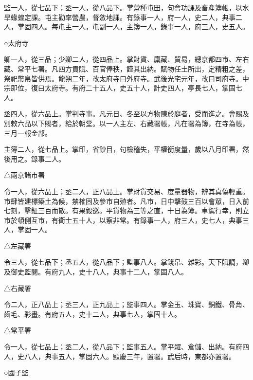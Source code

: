 \begin{pinyinscope}
 監一人，從七品下；丞一人，從八品下。掌營種屯田，句會功課及畜產簿帳，以水旱蝝蝗定課。屯主勸率營農，督斂地課。有錄事一人，府一人，史二人，典事二人，掌固四人。每屯主一人，屯副一人，主簿一人，錄事一人，府三人，史五人。



 ○太府寺



 卿一人，從三品；少卿二人，從四品上。掌財貨、廩藏、貿易，總京都四市、左右藏、常平七署。凡四方貢賦、百官俸秩，謹其出納。賦物任土所出，定精粗之差，祭祀幣帛皆供焉。龍朔二年，改太府寺曰外府寺。武後光宅元年，改曰司府寺。中宗即位，復曰太府寺。有府二十五人，史五十人，計史四人，亭長七人，掌固七人。



 丞四人，從六品上。掌判寺事。凡元日、冬至以方物陳於庭者，受而進之。會賜及別敕六品以下賜者，給於朝堂。以一人主左、右藏署帳，凡在署為簿，在寺為帳，三月一報金部。



 主簿二人，從七品上。掌印，省鈔目，句檢稽失，平權衡度量，歲以八月印署，然後用之。錄事二人。



 △兩京諸市署



 令一人，從六品上；丞二人，正八品上。掌財貨交易、度量器物，辨其真偽輕重。市肆皆建標築土為候，禁榷固及參市自殖者。凡市，日中擊鼓三百以會眾，日入前七刻，擊鉦三百而散。有果毅巡。平貨物為三等之直，十日為簿。車駕行幸，則立市於頓側互市，有衛士五十人，以察非常。有錄事一人，府三人，史七人，典事三人，掌固一人。



 △左藏署



 令三人，從七品下；丞五人，從八品下；監事八人。掌錢帛、雜彩。天下賦調，卿及御史監閱。有府九人，史十八人，典事十二人，掌固八人。



 △右藏署



 令二人，正八品上；丞三人，正九品上；監事四人。掌金玉、珠寶、銅鐵、骨角、齒毛、彩畫。有府五人，史十二人，典事七人，掌固十人。



 △常平署



 令一人，從七品上；丞二人，從八品下；監事五人。掌平糴、倉儲、出納。有府四人，史八人，典事五人，掌固六人。顯慶三年，置署。武后時，東都亦置署。



 ○國子監




\end{pinyinscope}
